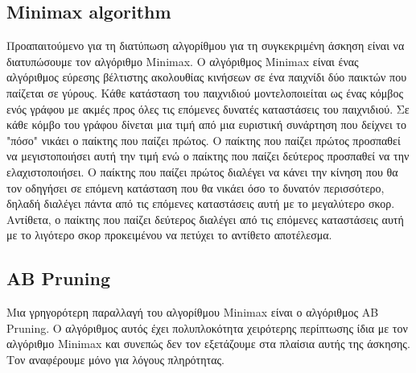 \documentclass[a4paper,oneside, 11pt]{article}
\begin{document}
\subsection{Minimax algorithm}
Προαπαιτούμενο για τη διατύπωση αλγορίθμου για τη συγκεκριμένη άσκηση είναι να διατυπώσουμε τον αλγόριθμο Minimax. Ο αλγόριθμος Minimax είναι ένας αλγόριθμος εύρεσης βέλτιστης ακολουθίας κινήσεων σε ένα παιχνίδι δύο παικτών που παίζεται σε γύρους. Κάθε κατάσταση του παιχνιδιού μοντελοποιείται ως ένας κόμβος ενός γράφου με ακμές προς όλες τις επόμενες δυνατές καταστάσεις του παιχνιδιού. Σε κάθε κόμβο του γράφου δίνεται μια τιμή από μια ευριστική συνάρτηση που δείχνει το "πόσο" νικάει ο παίκτης που παίζει πρώτος. Ο παίκτης που παίζει πρώτος προσπαθεί να μεγιστοποιήσει αυτή την τιμή ενώ ο παίκτης που παίζει δεύτερος προσπαθεί να την ελαχιστοποιήσει. Ο παίκτης που παίζει πρώτος διαλέγει να κάνει την κίνηση που θα τον οδηγήσει σε επόμενη κατάσταση που θα νικάει όσο το δυνατόν περισσότερο, δηλαδή διαλέγει πάντα από τις επόμενες καταστάσεις αυτή με το μεγαλύτερο σκορ. Αντίθετα, ο παίκτης που παίζει δεύτερος διαλέγει από τις επόμενες καταστάσεις αυτή με το λιγότερο σκορ προκειμένου να πετύχει το αντίθετο αποτέλεσμα.


\subsection{AB Pruning}
Μια γρηγορότερη παραλλαγή του αλγορίθμου Minimax είναι ο αλγόριθμος AB Pruning. Ο αλγόριθμος αυτός έχει πολυπλοκότητα χειρότερης περίπτωσης ίδια με τον αλγόριθμο Minimax και συνεπώς δεν τον εξετάζουμε στα πλαίσια αυτής της άσκησης. Τον αναφέρουμε μόνο για λόγους πληρότητας.
\end{document}
